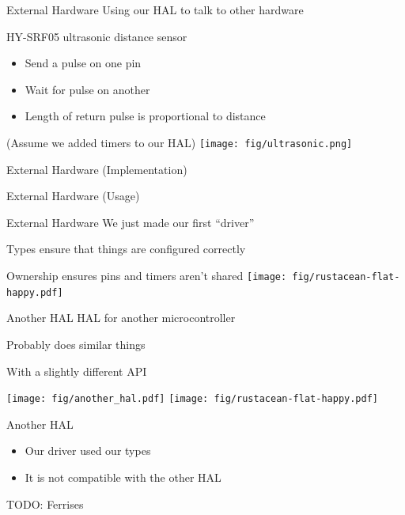 \documentclass[169]{beamer}
\begin{document}
\begin{frame}{External Hardware}
    Using our HAL to talk to other hardware

    HY-SRF05 ultrasonic distance sensor

    \begin{itemize}
        \item Send a pulse on one pin
        \item Wait for pulse on another
        \item Length of return pulse is proportional to distance
    \end{itemize}

    (Assume we added timers to our HAL)
    \hspace*{5cm}\texttt{[image: fig/ultrasonic.png]}
\end{frame}

\begin{frame}{External Hardware (Implementation)}
    
\end{frame}

\begin{frame}{External Hardware (Usage)}
    
\end{frame}

\begin{frame}{External Hardware}
    We just made our first ``driver''

    Types ensure that things are configured correctly

    Ownership ensures pins and timers aren't shared
    \hspace*{5cm}\texttt{[image: fig/rustacean-flat-happy.pdf]}
\end{frame}


\begin{frame}{Another HAL}
    HAL for another microcontroller

    Probably does similar things

    With a slightly different API

    \hspace*{1cm}\texttt{[image: fig/another\_hal.pdf]}
    \hspace*{5cm}\texttt{[image: fig/rustacean-flat-happy.pdf]}
\end{frame}

\begin{frame}{Another HAL}
    \begin{itemize}
        \item Our driver used our types
        \item It is not compatible with the other HAL
    \end{itemize}
    TODO: Ferrises
\end{frame}
\end{document}
